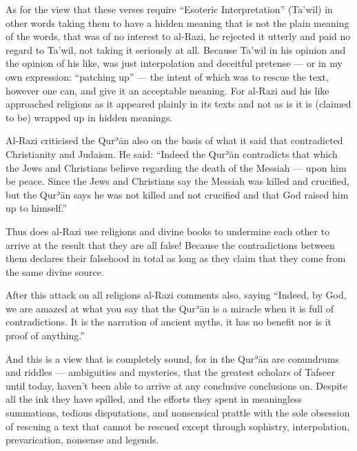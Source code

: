 \documentclass[12pt]{book}
\def \Quran{Qurʾān} %
\def \Qrn{\Quran}   %
\begin{document}
As for the view that these verses require “Esoteric Interpretation” (Ta’wil)
in other words taking them to have a hidden meaning that is not the plain
meaning of the words, that was of no interest to al-Razi, he rejected it
utterly and paid no regard to Ta’wil, not taking it seriously at all.
Because Ta’wil in his opinion and the opinion of his like, was just
interpolation and deceitful pretense — or in my own expression:
“patching up” — the intent of which was to rescue the text, however one can,
and give it an acceptable meaning.
For al-Razi and his like approached religions as it appeared plainly
in its texts and not as is it is (claimed to be)
wrapped up in hidden meanings.\footnotemark


Al-Razi criticised the \Qrn{} also on the basis of what it said that
contradicted Christianity and Judaism.
He said: “Indeed the \Qrn{} contradicts that which the Jews and Christians
believe regarding the death of the Messiah — upon him be peace.
Since the Jews and Christians say the Messiah was killed and crucified,
but the \Qrn{} says he was not killed and not crucified and that God
raised him up to himself.”\footnotemark


Thus does al-Razi use religions and divine books to undermine each other
to arrive at the result that they are all false!
Because the contradictions between them declares their falsehood in total
as long as they claim that they come from the same divine source.

After this attack on all religions al-Razi comments also, saying
“Indeed, by God, we are amazed at what you say that the \Qrn{} is a miracle
when it is full of contradictions.
It is the narration of ancient myths,
it has no benefit nor is it proof of anything.”\footnotemark


And this is a view that is completely sound,
for in the \Qrn{} are conundrums and riddles — ambiguities and mysteries,
that the greatest scholars of Tafseer until today,
haven’t been able to arrive at any conclusive conclusions on.
Despite all the ink they have spilled,
and the efforts they spent in meaningless summations, tedious disputations,
and nonsensical prattle with the sole obsession of rescuing a text
that cannot be rescued except through sophistry, interpolation,
prevarication, nonsense and legends.\footnotemark
\end{document}
